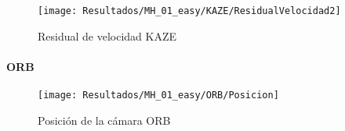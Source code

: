 \begin{figure}[H]
	\centering
	\texttt{[image: Resultados/MH\_01\_easy/KAZE/ResidualVelocidad2]}
	\caption{Residual de velocidad KAZE}
	\label{imagen:Resultados/MH_01_easy/KAZE/ResidualVelocidad}
\end{figure}


%
%
%
%
%
%
%
%

\paragraph {ORB}


\begin{figure}[H]
	\centering
	\texttt{[image: Resultados/MH\_01\_easy/ORB/Posicion]}
	\caption{Posición de la cámara ORB}
	\label{imagen:Resultados/MH_01_easy/ORB/Posicion}
\end{figure}




